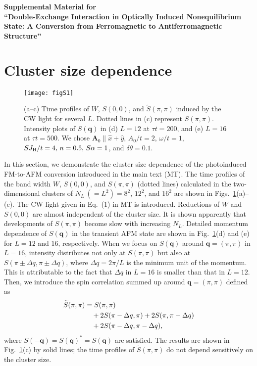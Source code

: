 \documentclass[aps,twocolumn,showpacs,prl,amsmath,amssymb]{revtex4-1}
\begin{document}
\clearpage
\begin{center}
{\large{\bf Supplemental Material for\\``Double-Exchange Interaction in Optically Induced Nonequilibrium State: A Conversion from Ferromagnetic to Antiferromagnetic Structure''}}
\end{center}

\section{Cluster size dependence}

\begin{figure}[b]\centering
\texttt{[image: figS1]}
\caption{(a--c) Time profiles of $W$, $S(0, 0)$, and $\widetilde{S}(\pi, \pi)$ induced by the CW light for several $L$. 
Dotted lines in (c) represent $S(\pi, \pi)$.
%
Intensity plots of $S(\bm{q})$ in (d) $L=12$ at $\tau t=200$, and (e) $L=16$ at $\tau t=500$. 
We chose $\bm{A}_0 \parallel \hat{x}+\hat{y}$, $A_0/t = 2$, $\omega/t = 1$, $ SJ_{\rm H}/t = 4,\, n = 0.5,\, S\alpha = 1$, and $\delta\theta = 0.1$.}
\label{fig:S1}
\end{figure}

In this section, we demonstrate the cluster size dependence of the photoinduced FM-to-AFM conversion introduced in the main text (MT). 
The time profiles of the band width $W$, $S(0, 0)$, and $S(\pi, \pi)$ (dotted lines) calculated in the two-dimensional clusters of $N_L \ ( = L^2) = 8^2,\,12^2$, and $16^2$ are shown in Figs.~\ref{fig:S1}(a)--(c). 
The CW light given in Eq.~(1) in MT is introduced. 
Reductions of $W$ and $S(0, 0)$ are almost independent of the cluster size. 
It is shown apparently that developments of $S(\pi, \pi)$ become slow with increasing $N_L$. 
Detailed momentum dependence of $S(\bm{q})$ in the transient AFM state are shown in Fig.~\ref{fig:S1}(d) and (e) for $L=12$ and  $16$, respectively. 
When we focus on $S(\bm{q})$ around $\bm{q}=(\pi, \pi)$ in $L=16$, 
intensity distributes not only at $S(\pi, \pi)$ but also at $S(\pi \pm \Delta q, \pi \pm \Delta q)$, where $\Delta q=2\pi/L$ is the minimum unit of the momentum. 
This is attributable to the fact that $\Delta q$ in $L=16$ is smaller than that in $L=12$. 
Then, we introduce the spin correlation summed up around $\bm{q}=(\pi, \pi)$ defined as 
\begin{align}
\widetilde{S}(\pi,\pi) &= S(\pi,\pi) \notag \\
& \quad + 2S(\pi-\Delta q, \pi) + 2S(\pi, \pi-\Delta q) \notag \\
& \quad+ 2 S(\pi-\Delta q, \pi-\Delta q) , 
\label{eq:stilde}
\end{align}
where $S(-\bm{q}) = S(\bm{q})^* = S(\bm{q})$ are satisfied. 
%
The results are shown in Fig.~\ref{fig:S1}(c) by solid lines; 
the time profiles of $\widetilde{S}(\pi,\pi)$ do not depend sensitively on the cluster size.
\end{document}
